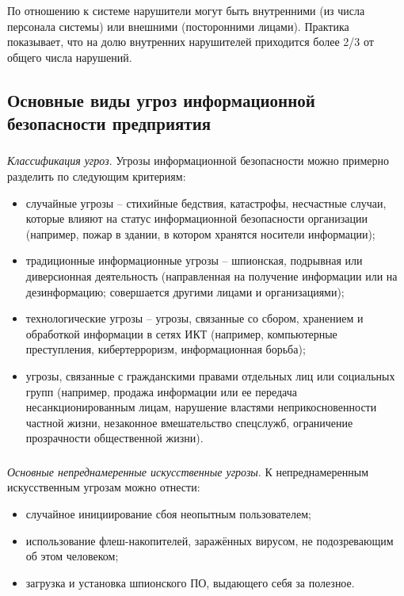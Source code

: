 По отношению к системе нарушители могут быть внутренними (из числа персонала системы) или внешними (посторонними лицами). Практика показывает, что на долю внутренних
нарушителей приходится более 2/3 от общего числа нарушений. \cite{vasilkov}

\subsection{Основные виды угроз информационной безопасности предприятия}
\label{subsec:problems:threats}

\subsubsection{}
\label{subsubsec:problems:threats:classification}

\textit{Классификация угроз}. Угрозы информационной безопасности можно примерно разделить по
следующим критериям:
\begin{itemize}
	\item случайные угрозы -- стихийные бедствия, катастрофы, несчастные
случаи, которые влияют на статус информационной безопасности
организации (например, пожар в здании, в котором хранятся носители
информации);
	\item традиционные информационные угрозы -- шпионская, подрывная или диверсионная деятельность (направленная на получение информации или на дезинформацию; совершается другими лицами и организациями);
	\item технологические угрозы -- угрозы, связанные со сбором, хранением и обработкой информации в сетях ИКТ (например, компьютерные преступления, кибертерроризм, информационная борьба);
	\item угрозы, связанные с гражданскими правами отдельных лиц или социальных групп (например, продажа информации или ее передача несанкционированным лицам, нарушение властями неприкосновенности частной жизни, незаконное вмешательство спецслужб, ограничение прозрачности \cite{devyanin} общественной жизни).
\end{itemize}

\subsubsection{}
\label{subsubsec:problems:threats:unintentional}

\textit{Основные непреднамеренные искусственные угрозы}.
К непреднамеренным искусственным угрозам можно отнести:
\begin{itemize}
	\item случайное инициирование сбоя неопытным пользователем;
	\item использование флеш-накопителей, заражённых вирусом, не подозревающим об этом человеком;
	\item загрузка и установка шпионского ПО, выдающего себя за полезное.
\end{itemize}

